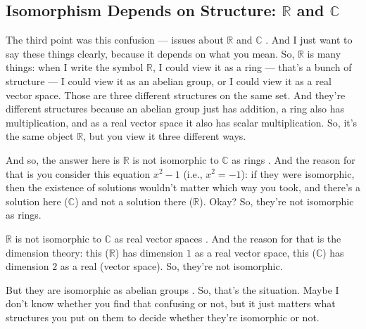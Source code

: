 \subsection{Isomorphism Depends on Structure: \texorpdfstring{$\mathbb{R}$ and $\mathbb{C}$}{R and C}}

\begin{speech}[00:07:35 - 00:09:16]
The third point was this confusion --- issues about $\mathbb{R}$ and $\mathbb{C}$ . And I just want to say these things clearly, because it depends on what you mean. So, $\mathbb{R}$ is many things: when I write the symbol $\mathbb{R}$, I could view it as a ring --- that's a bunch of structure --- I could view it as an abelian group, or I could view it as a real vector space. Those are three different structures on the same set. And they're different structures because an abelian group just has addition, a ring also has multiplication, and as a real vector space it also has scalar multiplication. So, it's the same object $\mathbb{R}$, but you view it three different ways.

And so, the answer here is $\mathbb{R}$ is not isomorphic to $\mathbb{C}$ as rings . And the reason for that is you consider this equation $x^2 - 1$ (i.e., $x^2 = -1$): if they were isomorphic, then the existence of solutions wouldn't matter which way you took, and there's a solution here ($\mathbb{C}$) and not a solution there ($\mathbb{R}$). Okay? So, they're not isomorphic as rings.

$\mathbb{R}$ is not isomorphic to $\mathbb{C}$ as real vector spaces . And the reason for that is the dimension theory: this ($\mathbb{R}$) has dimension $1$ as a real vector space, this ($\mathbb{C}$) has dimension $2$ as a real (vector space). So, they're not isomorphic.

But they are isomorphic as abelian groups . So, that's the situation. Maybe I don't know whether you find that confusing or not, but it just matters what structures you put on them to decide whether they're isomorphic or not.
\end{speech}


